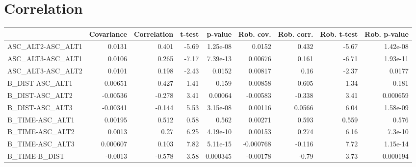 \section{Correlation}
\begin{tabular}{lrrrrrrrr}
\toprule
{} &  Covariance &  Correlation &  t-test &  p-value &  Rob. cov. &  Rob. corr. &  Rob. t-test &  Rob. p-value \\
\midrule
ASC\_ALT2-ASC\_ALT1 &      0.0131 &        0.401 &   -5.69 & 1.25e-08 &     0.0152 &       0.432 &        -5.67 &      1.42e-08 \\
ASC\_ALT3-ASC\_ALT1 &      0.0106 &        0.265 &   -7.17 & 7.39e-13 &    0.00676 &       0.161 &        -6.71 &      1.93e-11 \\
ASC\_ALT3-ASC\_ALT2 &      0.0101 &        0.198 &   -2.43 &   0.0152 &    0.00817 &        0.16 &        -2.37 &        0.0177 \\
B\_DIST-ASC\_ALT1   &    -0.00651 &       -0.427 &   -1.41 &    0.159 &   -0.00858 &      -0.605 &        -1.34 &         0.181 \\
B\_DIST-ASC\_ALT2   &    -0.00536 &       -0.278 &    3.41 &  0.00064 &   -0.00583 &      -0.338 &         3.41 &      0.000659 \\
B\_DIST-ASC\_ALT3   &    -0.00341 &       -0.144 &    5.53 & 3.15e-08 &    0.00116 &      0.0566 &         6.04 &      1.58e-09 \\
B\_TIME-ASC\_ALT1   &     0.00195 &        0.512 &    0.58 &    0.562 &    0.00271 &       0.593 &        0.559 &         0.576 \\
B\_TIME-ASC\_ALT2   &      0.0013 &         0.27 &    6.25 & 4.19e-10 &    0.00153 &       0.274 &         6.16 &       7.3e-10 \\
B\_TIME-ASC\_ALT3   &    0.000607 &        0.103 &    7.82 & 5.11e-15 &  -0.000768 &      -0.116 &         7.72 &      1.15e-14 \\
B\_TIME-B\_DIST     &     -0.0013 &       -0.578 &    3.58 & 0.000345 &   -0.00178 &       -0.79 &         3.73 &      0.000194 \\
\bottomrule
\end{tabular}
